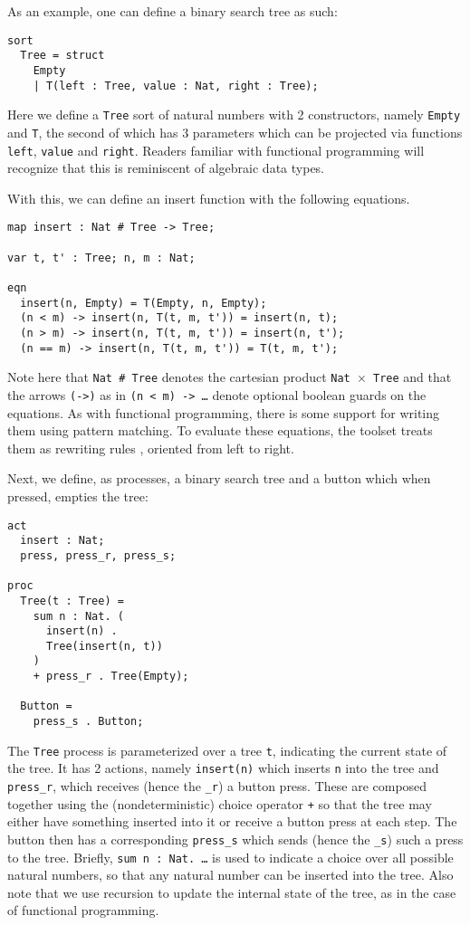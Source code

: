 \documentclass{article}
\begin{document}
As an example, one can define a binary search tree as such:
\begin{verbatim}
sort
  Tree = struct
    Empty
    | T(left : Tree, value : Nat, right : Tree);
\end{verbatim}
Here we define a \texttt{Tree} sort of natural numbers with 2 constructors,
namely \texttt{Empty} and \texttt{T}, the second of which has 3 parameters which
can be projected via functions \texttt{left}, \texttt{value} and \texttt{right}.
Readers familiar with functional programming will recognize that this is
reminiscent of algebraic data types.

With this, we can define an insert function with the following equations.

\begin{verbatim}
map insert : Nat # Tree -> Tree;

var t, t' : Tree; n, m : Nat;

eqn
  insert(n, Empty) = T(Empty, n, Empty);
  (n < m) -> insert(n, T(t, m, t')) = insert(n, t);
  (n > m) -> insert(n, T(t, m, t')) = insert(n, t');
  (n == m) -> insert(n, T(t, m, t')) = T(t, m, t');
\end{verbatim}

Note here that \texttt{Nat \# Tree} denotes the cartesian product
\texttt{Nat $\times$ Tree} and that the arrows \texttt{(->)} as in
\texttt{(n < m) -> \dots} denote optional boolean guards on the equations.
As with functional programming, there is some support for writing them using
pattern matching.
To evaluate these equations, the toolset treats them as rewriting rules
\cite{mcrl_rewriting}, oriented from left to right.

Next, we define, as processes, a binary search tree and a button which
when pressed, empties the tree:

\begin{verbatim}
act
  insert : Nat;
  press, press_r, press_s;

proc
  Tree(t : Tree) =
    sum n : Nat. (
      insert(n) .
      Tree(insert(n, t))
    )
    + press_r . Tree(Empty);

  Button =
    press_s . Button;
\end{verbatim}

The \texttt{Tree} process is parameterized over a tree \texttt{t}, indicating
the current state of the tree.
It has 2 actions, namely \texttt{insert(n)} which inserts \texttt{n} into the
tree and \texttt{press\_r}, which receives (hence the \texttt{\_r}) a button
press.
These are composed together using the (nondeterministic) choice operator
\texttt{+} so that the
tree may either have something inserted into it or receive a button press at
each step.
The button then has a corresponding \texttt{press\_s} which sends
(hence the \texttt{\_s}) such a press to the tree.
Briefly, \texttt{sum n : Nat. \dots} is used to indicate a
choice over all possible natural numbers, so that any natural number can be
inserted into the tree.
Also note that we use recursion to update the internal state of the tree, as in
the case of functional programming.
\end{document}

